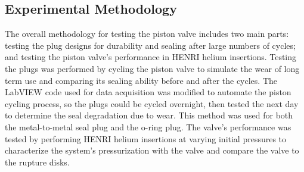 \subsection{Experimental Methodology} \label{s:methodology}


The overall methodology for testing the piston valve includes two main parts: testing the plug designs for durability and sealing after large numbers of cycles; and testing the piston valve's performance in HENRI helium insertions. Testing the plugs was performed by cycling the piston valve to simulate the wear of long term use and comparing its sealing ability before and after the cycles. The LabVIEW code used for data acquisition was modified to automate the piston cycling process, so the plugs could be cycled overnight, then tested the next day to determine the seal degradation due to wear. This method was used for both the metal-to-metal seal plug and the o-ring plug. The valve's performance was tested by performing HENRI helium insertions at varying initial pressures to characterize the system's pressurization with the valve and compare the valve to the rupture disks.